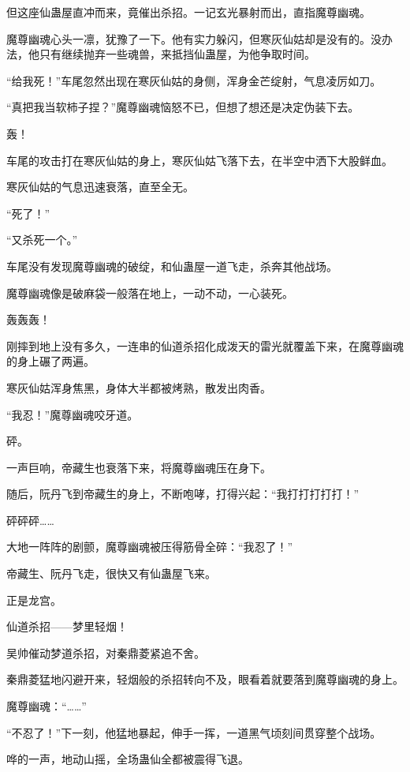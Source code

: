 \begin{this_body}
但这座仙蛊屋直冲而来，竟催出杀招。一记玄光暴射而出，直指魔尊幽魂。

魔尊幽魂心头一凛，犹豫了一下。他有实力躲闪，但寒灰仙姑却是没有的。没办法，他只有继续抛弃一些魂兽，来抵挡仙蛊屋，为他争取时间。

“给我死！”车尾忽然出现在寒灰仙姑的身侧，浑身金芒绽射，气息凌厉如刀。

“真把我当软柿子捏？”魔尊幽魂恼怒不已，但想了想还是决定伪装下去。

轰！

车尾的攻击打在寒灰仙姑的身上，寒灰仙姑飞落下去，在半空中洒下大股鲜血。

寒灰仙姑的气息迅速衰落，直至全无。

“死了！”

“又杀死一个。”

车尾没有发现魔尊幽魂的破绽，和仙蛊屋一道飞走，杀奔其他战场。

魔尊幽魂像是破麻袋一般落在地上，一动不动，一心装死。

轰轰轰！

刚摔到地上没有多久，一连串的仙道杀招化成泼天的雷光就覆盖下来，在魔尊幽魂的身上碾了两遍。

寒灰仙姑浑身焦黑，身体大半都被烤熟，散发出肉香。

“我忍！”魔尊幽魂咬牙道。

砰。

一声巨响，帝藏生也衰落下来，将魔尊幽魂压在身下。

随后，阮丹飞到帝藏生的身上，不断咆哮，打得兴起：“我打打打打打！”

砰砰砰……

大地一阵阵的剧颤，魔尊幽魂被压得筋骨全碎：“我忍了！”

帝藏生、阮丹飞走，很快又有仙蛊屋飞来。

正是龙宫。

仙道杀招——梦里轻烟！

吴帅催动梦道杀招，对秦鼎菱紧追不舍。

秦鼎菱猛地闪避开来，轻烟般的杀招转向不及，眼看着就要落到魔尊幽魂的身上。

魔尊幽魂：“……”

“不忍了！”下一刻，他猛地暴起，伸手一挥，一道黑气顷刻间贯穿整个战场。

哗的一声，地动山摇，全场蛊仙全都被震得飞退。

\end{this_body}

